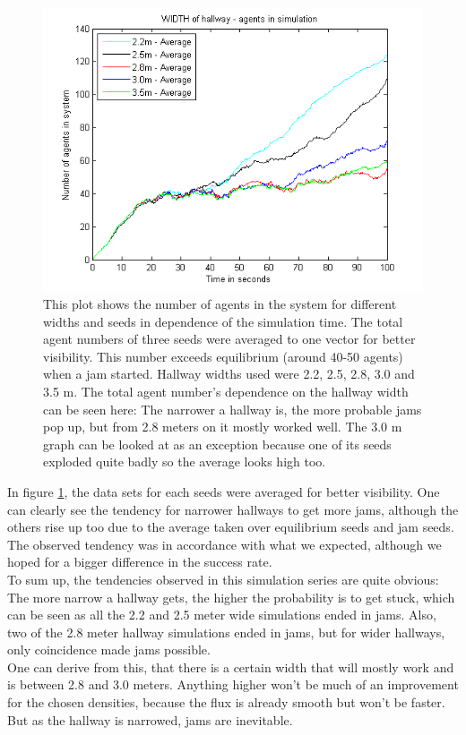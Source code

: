 \begin{figure}[h!]
	\centering
		\includegraphics[width=1.00\textwidth]{pictures/AAveragesInOne.png}
	\caption{This plot shows the number of agents in the system for different widths and seeds in dependence of the simulation time. The total agent numbers of three seeds were averaged to one vector for better visibility. This number exceeds equilibrium (around 40-50 agents) when a jam started.  Hallway widths used were 2.2, 2.5, 2.8, 3.0 and 3.5 m. The total agent number's dependence on the hallway width can be seen here: The narrower a hallway is, the more probable jams pop up, but from 2.8 meters on it mostly worked well. The 3.0 m graph can be looked at as an exception because one of its seeds exploded quite badly so the average looks high too.}
	\label{fig:AveragesInOne}
\end{figure}

\noi In figure \ref{fig:AveragesInOne}, the data sets for each seeds were averaged for better visibility. One can clearly see the tendency for narrower hallways to get more jams, although the others rise up too due to the average taken over equilibrium seeds and jam seeds.\\

\noi The observed tendency was in accordance with what we expected, although we hoped for a bigger difference in the success rate.\\

To sum up, the tendencies observed in this simulation series are quite obvious: The more narrow a hallway gets, the higher the probability is to get stuck, which can be seen as all the 2.2 and 2.5 meter wide simulations ended in jams. Also, two of the 2.8 meter hallway simulations ended in jams, but for wider hallways, only coincidence made jams possible.\\
One can derive from this, that there is a certain width that will mostly work and is between 2.8 and 3.0 meters. Anything higher won't be much of an improvement for the chosen densities, because the flux is already smooth but won't be faster. But as the hallway is narrowed, jams are inevitable.\\
